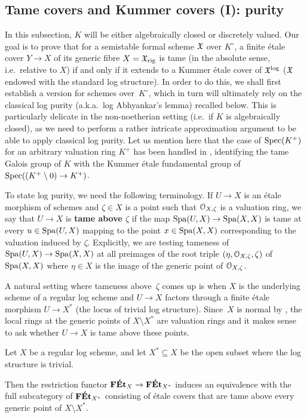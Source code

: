 \subsection{Tame covers and Kummer covers (I): purity}
\label{ss:log-abhyankar}

In this subsection, $K$ will be either algebraically closed  or 
    discretely valued.
Our goal is to prove that for a semistable formal scheme ${\mathfrak{X}}$ over $K^\circ$, a finite \'etale cover $Y\to X$ of its generic fibre $X={\mathfrak{X}}_{{\rm rig}}$ is tame (in the absolute sense, i.e.\ relative to $X$) if and only if it extends to a Kummer \'etale cover of ${\mathfrak{X}}^{\rm log}$ (${\mathfrak{X}}$ endowed with the standard log structure). In order to do this, we shall first establish a version for schemes over~$K^\circ$, which in turn will ultimately rely on the classical log purity (a.k.a.\ log Abhyankar's lemma) recalled below. This is particularly delicate in the non-noetherian setting (i.e.\ if $K$ is algebraically closed), as we need to perform a rather intricate approximation argument to be able to apply classical log purity. Let us mention here that the case of $\operatorname{Spec}(K^+)$ for an arbitrary valuation ring $K^+$ has been handled in \cite[Corollary~4.4.9]{AHLS-Log}, identifying the tame Galois group of $K$ with the Kummer \'etale fundamental group of $\operatorname{Spec}((K^+\setminus 0)\to K^+)$. 

To state log purity, we need the following terminology. If $U\to X$ is an \'etale morphism of schemes and $\zeta\in X$ is a point such that ${\mathcal O}_{X,\zeta}$ is a valuation ring, we say that $U\to X$ is {\bf tame above $\zeta$} if the map $\operatorname{Spa}(U, X)\to \operatorname{Spa}(X, X)$ is tame at every $u\in \operatorname{Spa}(U, X)$ mapping to the point $x\in \operatorname{Spa}(X, X)$ corresponding to the valuation induced by $\zeta$.
Explicitly, we are testing tameness of $\operatorname{Spa}(U,X) \to \operatorname{Spa}(X,X)$ at all preimages of the root triple $(\eta, {\mathcal O}_{X,\zeta},\zeta)$ of $\operatorname{Spa}(X,X)$ where $\eta\in X$ is the image of the generic point of ${\mathcal O}_{X,\zeta}$.

A natural setting where tameness above~$\zeta$ comes up is when $X$ is the underlying scheme of a regular log scheme and $U \to X$ factors through a finite étale morphism $U \to X^*$ (the locus of trivial log structure).
Since~$X$ is normal by \cite[Theorem~4.1]{KatoToricSingularities}, the local rings at the generic points of $X \setminus X^*$ are valuation rings and it makes sense to ask whether $U \to X$ is tame above these points.

\begin{thm} 
\label{thm:GR-log-Abhyankar}
    Let $X$ be a regular log scheme, and 
    let $X^* \subseteq X$ be the open subset where the log structure is trivial. 
    
    Then the restriction functor $\mathbf{F\acute{E}t}_X\to \mathbf{F\acute{E}t}_{X^*}$ induces an equivalence with the full subcategory of $\mathbf{F\acute{E}t}_{X^*}$ consisting of \'etale covers that are tame above every generic point of $X\setminus X^*$.
\end{thm}


